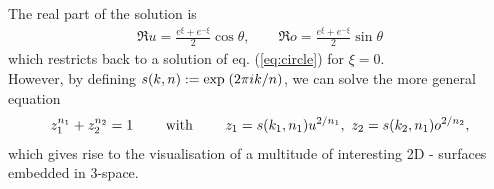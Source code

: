 The real part of the solution is
\begin{equation}
  \begin{split}
    \Re{u} = \frac{e^{\xi}+e^{-\xi}}{2}\cos\theta,\qquad
    \Re o = \frac{e^{\xi}+e^{-\xi}}{2}\sin\theta
\end{split}
\end{equation}
which restricts back to a solution of eq. (\ref{eq:circle}) for $\xi=0$.\\
However, by defining $s(k,n):=\exp\mathrel{ \left(2\pi i k/n\right) }$, we can solve the more general equation
\begin{equation}
  \begin{split}
    z_1^{n_1}+z_2^{n_2}=1\qquad \text{ with } \qquad z_1 = s(k_1,n_1)u^{2/n_1},~z_2 = s(k_2,n_1)o^{2/n_2},
\end{split}
  \label{eq:complexGeneralCircle}
\end{equation}
which gives rise to the visualisation of a multitude of interesting 2D - surfaces embedded in 3-space.

